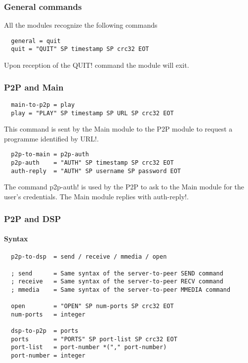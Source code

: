 \documentclass{medusabook}
\begin{document}
\subsubsection{General commands}
\label{subsub:2.2.1;medusa_book}

All the modules recognize the following commands

\begin{verbatim}
  general = quit
  quit = "QUIT" SP timestamp SP crc32 EOT
\end{verbatim}
%
Upon reception of the \ttt QUIT! command the module will exit.

\subsubsection{P2P and Main}
\label{subsub:2.2.0;medusa_book}

\begin{verbatim}
  main-to-p2p = play
  play = "PLAY" SP timestamp SP URL SP crc32 EOT
\end{verbatim}
%
This command is sent by the Main module to the P2P module to request a
programme identified by \ttt URL!.

\begin{verbatim}
  p2p-to-main = p2p-auth
  p2p-auth    = "AUTH" SP timestamp SP crc32 EOT
  auth-reply  = "AUTH" SP username SP password EOT
\end{verbatim}
%
The command \ttt p2p-auth! is used by the P2P to ask to the Main
module for the user's credentials.  The Main module replies with \ttt
auth-reply!. 

\subsubsection{P2P and DSP}
\label{subsub:2.2.2;medusa_book}

\paragraph{Syntax}
\begin{verbatim}
  p2p-to-dsp  = send / receive / mmedia / open

  ; send      = Same syntax of the server-to-peer SEND command
  ; receive   = Same syntax of the server-to-peer RECV command
  ; mmedia    = Same syntax of the server-to-peer MMEDIA command

  open        = "OPEN" SP num-ports SP crc32 EOT
  num-ports   = integer

  dsp-to-p2p  = ports 
  ports       = "PORTS" SP port-list SP crc32 EOT
  port-list   = port-number *("," port-number)
  port-number = integer
\end{verbatim}
\end{document}

